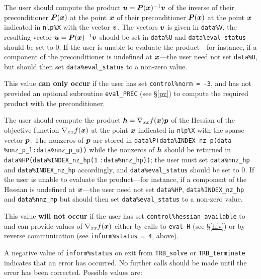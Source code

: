 \documentclass{galahad}
\newcommand{\packagename}{TRB}
\begin{document}
\begin{description}
 The user should compute the product ${\bm{u}} = {\bm{P}}({\bm{x}})^{-1}{\bm{v}}$
     of the inverse of their preconditioner ${\bm{P}}({\bm{x}})$ at the point ${\bm{x}}$
     of their preconditioner ${\bm{P}}({\bm{x}})$ at the point ${\bm{x}}$
     indicated in {\tt nlp\%X} with the vector ${\bm{v}}$.
     The vectors ${\bm{v}}$ is given in {\tt data\%V}, the
     resulting vector ${\bm{u}} = {\bm{P}}({\bm{x}})^{-1}{\bm{v}}$ should be set in 
      {\tt data\%U} and {\tt data\%eval\_status}
     should be set to 0. If the user is unable to evaluate the product---for
     instance, if a component of the preconditioner is undefined at
     ${\bm{x}}$---the user need not set {\tt data\%U}, but should then set
     {\tt data\%eval\_status} to a non-zero value.

     \noindent
     This value {\bf can only occur} if the user has set 
     {\tt control\%norm = -3}, and has not provided an optional
     subroutine {\tt eval\_PREC} (see \S\ref{pv}) to compute the required
     product with the preconditioner.

 The user should compute the product
     ${\bm{h}} = \nabla_{xx} f({\bm{x}}){\bm{p}}$ of the Hessian
     of the objective function $\nabla_{xx} f({\bm{x}})$ at the point ${\bm{x}}$
     indicated in {\tt nlp\%X} with the sparse vector ${\bm{p}}$.
     The nonzeros of ${\bm{p}}$ are stored in
     {\tt data\%P(data\%INDEX\_nz\_p(data}
     {\tt \%nnz\_p\_l:data\%nnz\_p\_u))}
     while the nonzeros of ${\bm{h}}$ should be returned in
     {\tt data\%HP(data\%INDEX\_nz\_hp(1}
     {\tt :data\%nnz\_hp))}; the user must set 
     {\tt data\%nnz\_hp} and {\tt data\%INDEX\_nz\_hp} accordingly,
     and  {\tt data\%eval\_status} should be set to 0. If the user is
     unable to evaluate the product---for instance, if a component of 
     the Hessian is undefined at ${\bm{x}}$---the user need not set 
     {\tt data\%HP}, {\tt data\%INDEX\_nz\_hp} and {\tt data\%nnz\_hp}
     but should then set {\tt data\%eval\_status} to a non-zero value.

     \noindent
     This value {\bf will not occur} if the user has set 
     {\tt control\%hessian\_available} to \true\, and can provide
     values of $\nabla_{xx} f({\bm{x}})$  either by calls to {\tt eval\_H} 
     (see \S\ref{hfv}) or by reverse communication (see 
     {\tt inform\%status = 4}, above).
\end{description}



\galerrors
A negative value of {\tt inform\%status} on exit from
{\tt \packagename\_solve}
or
{\tt \packagename\_terminate}
indicates that an error has occurred. No further calls should be made
until the error has been corrected. Possible values are:
\end{document}
